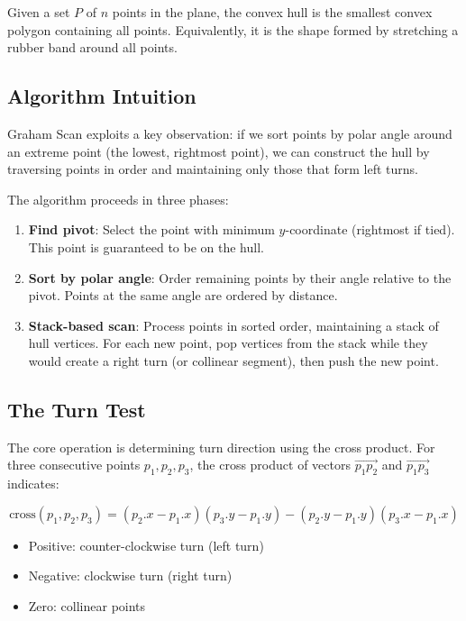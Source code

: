 \documentclass[11pt,a4paper]{article}
\begin{document}
Given a set $P$ of $n$ points in the plane, the convex hull is the smallest convex polygon containing all points. Equivalently, it is the shape formed by stretching a rubber band around all points.

\subsection{Algorithm Intuition}

Graham Scan exploits a key observation: if we sort points by polar angle around an extreme point (the lowest, rightmost point), we can construct the hull by traversing points in order and maintaining only those that form left turns.

The algorithm proceeds in three phases:

\begin{enumerate}
    \item \textbf{Find pivot}: Select the point with minimum $y$-coordinate (rightmost if tied). This point is guaranteed to be on the hull.

    \item \textbf{Sort by polar angle}: Order remaining points by their angle relative to the pivot. Points at the same angle are ordered by distance.

    \item \textbf{Stack-based scan}: Process points in sorted order, maintaining a stack of hull vertices. For each new point, pop vertices from the stack while they would create a right turn (or collinear segment), then push the new point.
\end{enumerate}

\subsection{The Turn Test}

The core operation is determining turn direction using the cross product. For three consecutive points $p_1, p_2, p_3$, the cross product of vectors $\overrightarrow{p_1p_2}$ and $\overrightarrow{p_1p_3}$ indicates:

\begin{equation}
    \text{cross}(p_1, p_2, p_3) = (p_2.x - p_1.x)(p_3.y - p_1.y) - (p_2.y - p_1.y)(p_3.x - p_1.x)
\end{equation}

\begin{itemize}
    \item Positive: counter-clockwise turn (left turn)
    \item Negative: clockwise turn (right turn)
    \item Zero: collinear points
\end{itemize}
\end{document}
